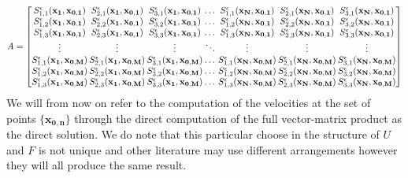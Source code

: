 \begin{equation*}
A = 
\begingroup
\setlength\arraycolsep{1pt}
\begin{bmatrix}
S^{\epsilon}_{1,1}(\mathbf{x_1},\mathbf{x_{0,1}}) & S^{\epsilon}_{2,1}(\mathbf{x_1},\mathbf{x_{0,1}}) & S^{\epsilon}_{3,1}(\mathbf{x_1},\mathbf{x_{0,1}}) & \dots & S^{\epsilon}_{1,1}(\mathbf{x_N},\mathbf{x_{0,1}}) & S^{\epsilon}_{2,1}(\mathbf{x_N},\mathbf{x_{0,1}}) & S^{\epsilon}_{3,1}(\mathbf{x_N},\mathbf{x_{0,1}})\\
S^{\epsilon}_{1,2}(\mathbf{x_1},\mathbf{x_{0,1}}) & S^{\epsilon}_{2,2}(\mathbf{x_1},\mathbf{x_{0,1}}) & S^{\epsilon}_{3,2}(\mathbf{x_1},\mathbf{x_{0,1}}) & \dots & S^{\epsilon}_{1,2}(\mathbf{x_N},\mathbf{x_{0,1}}) & S^{\epsilon}_{2,2}(\mathbf{x_N},\mathbf{x_{0,1}}) & S^{\epsilon}_{3,2}(\mathbf{x_N},\mathbf{x_{0,1}})\\
S^{\epsilon}_{1,3}(\mathbf{x_1},\mathbf{x_{0,1}}) & S^{\epsilon}_{2,3}(\mathbf{x_1},\mathbf{x_{0,1}}) & S^{\epsilon}_{3,3}(\mathbf{x_1},\mathbf{x_{0,1}}) & \dots & S^{\epsilon}_{1,3}(\mathbf{x_N},\mathbf{x_{0,1}}) & S^{\epsilon}_{2,3}(\mathbf{x_N},\mathbf{x_{0,1}}) & S^{\epsilon}_{3,3}(\mathbf{x_N},\mathbf{x_{0,1}})\\
\vdots & \vdots & \vdots & \ddots & \vdots & \vdots & \vdots \\
S^{\epsilon}_{1,1}(\mathbf{x_1},\mathbf{x_{0,M}}) & S^{\epsilon}_{2,1}(\mathbf{x_1},\mathbf{x_{0,M}}) & S^{\epsilon}_{3,1}(\mathbf{x_1},\mathbf{x_{0,M}}) & \dots & S^{\epsilon}_{1,1}(\mathbf{x_N},\mathbf{x_{0,M}}) & S^{\epsilon}_{2,1}(\mathbf{x_N},\mathbf{x_{0,M}}) & S^{\epsilon}_{3,1}(\mathbf{x_N},\mathbf{x_{0,M}})  \\
S^{\epsilon}_{1,2}(\mathbf{x_1},\mathbf{x_{0,M}}) & S^{\epsilon}_{2,2}(\mathbf{x_1},\mathbf{x_{0,M}}) & S^{\epsilon}_{3,2}(\mathbf{x_1},\mathbf{x_{0,M}}) & \dots & S^{\epsilon}_{1,2}(\mathbf{x_N},\mathbf{x_{0,M}}) & S^{\epsilon}_{2,2}(\mathbf{x_N},\mathbf{x_{0,M}}) & S^{\epsilon}_{3,2}(\mathbf{x_N},\mathbf{x_{0,M}}) \\
S^{\epsilon}_{1,3}(\mathbf{x_1},\mathbf{x_{0,M}}) & S^{\epsilon}_{2,3}(\mathbf{x_1},\mathbf{x_{0,M}}) & S^{\epsilon}_{3,3}(\mathbf{x_1},\mathbf{x_{0,M}}) & \dots & S^{\epsilon}_{1,3}(\mathbf{x_N},\mathbf{x_{0,M}}) & S^{\epsilon}_{2,3}(\mathbf{x_N},\mathbf{x_{0,M}}) & S^{\epsilon}_{3,3}(\mathbf{x_N},\mathbf{x_{0,M}}) \\
\end{bmatrix}
\endgroup
\end{equation*}
\normalsize
We will from now on refer to the computation of the velocities at the set of points $\{ \mathbf{x_{0,n}} \}$ through the direct computation of the full vector-matrix product as the direct solution.
We do note that this particular choose in the structure of $U$ and $F$ is not unique and other literature may use different arrangements however they will all produce the same result. 

